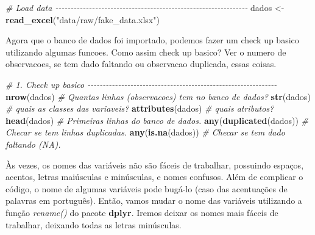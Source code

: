 \documentclass[
]{book}
\newenvironment{Shaded}{\begin{snugshade}}{\end{snugshade}}
\newcommand{\CommentTok}[1]{\textcolor[rgb]{0.56,0.35,0.01}{\textit{#1}}}
\newcommand{\FunctionTok}[1]{\textcolor[rgb]{0.13,0.29,0.53}{\textbf{#1}}}
\newcommand{\NormalTok}[1]{#1}
\newcommand{\OtherTok}[1]{\textcolor[rgb]{0.56,0.35,0.01}{#1}}
\newcommand{\StringTok}[1]{\textcolor[rgb]{0.31,0.60,0.02}{#1}}
\begin{document}
\begin{Shaded}
\begin{Highlighting}[]

\CommentTok{\# Load data {-}{-}{-}{-}{-}{-}{-}{-}{-}{-}{-}{-}{-}{-}{-}{-}{-}{-}{-}{-}{-}{-}{-}{-}{-}{-}{-}{-}{-}{-}{-}{-}{-}{-}{-}{-}{-}{-}{-}{-}{-}{-}{-}{-}{-}{-}{-}{-}{-}{-}{-}{-}{-}{-}{-}{-}{-}{-}{-}{-}{-}{-}{-}}
\NormalTok{dados }\OtherTok{\textless{}{-}} \FunctionTok{read\_excel}\NormalTok{(}\StringTok{"data/raw/fake\_data.xlsx"}\NormalTok{)}
\end{Highlighting}
\end{Shaded}

Agora que o banco de dados foi importado, podemos fazer um check up basico utilizando algumas funcoes. Como assim check up basico? Ver o numero de observacoes, se tem dado faltando ou observacao duplicada, essas coisas.

\begin{Shaded}
\begin{Highlighting}[]

\CommentTok{\# 1. Check up basico {-}{-}{-}{-}{-}{-}{-}{-}{-}{-}{-}{-}{-}{-}{-}{-}{-}{-}{-}{-}{-}{-}{-}{-}{-}{-}{-}{-}{-}{-}{-}{-}{-}{-}{-}{-}{-}{-}{-}{-}{-}{-}{-}{-}{-}{-}{-}{-}{-}{-}{-}{-}{-}{-}{-}{-}{-}{-}{-}{-}{-}{-}}
\FunctionTok{nrow}\NormalTok{(dados)             }\CommentTok{\# Quantas linhas (observacoes) tem no banco de dados?}
\FunctionTok{str}\NormalTok{(dados)              }\CommentTok{\# quais as classes das variaveis?}
\FunctionTok{attributes}\NormalTok{(dados)       }\CommentTok{\# quais atributos?}
\FunctionTok{head}\NormalTok{(dados)             }\CommentTok{\# Primeiras linhas do banco de dados.}
\FunctionTok{any}\NormalTok{(}\FunctionTok{duplicated}\NormalTok{(dados))  }\CommentTok{\# Checar se tem linhas duplicadas.}
\FunctionTok{any}\NormalTok{(}\FunctionTok{is.na}\NormalTok{(dados))       }\CommentTok{\# Checar se tem dado faltando (NA).}
\end{Highlighting}
\end{Shaded}

Às vezes, os nomes das variáveis não são fáceis de trabalhar, possuindo espaços, acentos, letras maiúsculas e minúsculas, e nomes confusos. Além de complicar o código, o nome de algumas variáveis pode bugá-lo (caso das acentuações de palavras em português). Então, vamos mudar o nome das variáveis utilizando a função \emph{rename()} do pacote \textbf{dplyr}. Iremos deixar os nomes mais fáceis de trabalhar, deixando todas as letras minúsculas.
\end{document}
